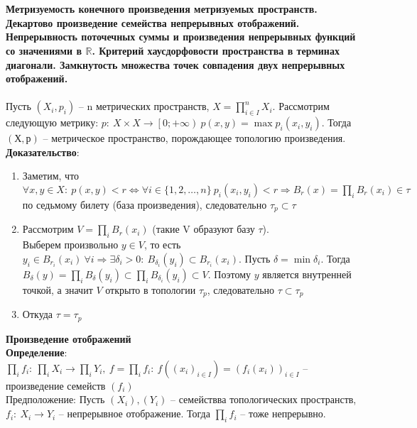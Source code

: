 \newpage
\section{}
	\textbf{Метризуемость конечного произведения метризуемых пространств. Декартово произведение семейства непрерывных отображений. Непрерывность поточечных суммы и произведения непрерывных функций со значениями в $\mathbb{R}$. Критерий хаусдорфовости пространства в терминах диагонали. Замкнутость множества точек совпадения двух непрерывных отображений.}\\
	\\
	Пусть $(X_i, p_i)$ -- n метрических пространств, $X = \prod_{i\in I}^n X_i$. Рассмотрим следующую метрику: $p:\ X\times X \rightarrow \left[0;+ \infty\right)\ p(x,y) = \max{p_i(x_i,y_i)}$. Тогда $(Х, р)$ -- метрическое пространство, порождающее топологию произведения.\\
	\textbf{Доказательство}:
	\begin{enumerate}
		\item 
		Заметим, что $\forall x, y \in X:\ p(x,y) < r \Leftrightarrow \forall i\in \{1, 2, \ldots ,n\}\ p_i(x_i,y_i) < r \Rightarrow B_r(x) = \prod_i B_r(x_i) \in \tau$ по седьмому билету (база произведения), следовательно $\tau_p \subset \tau$
		\item 
		Рассмотрим $V = \prod_i B_r(x_i)$ (такие V образуют базу $\tau$).\\
		Выберем произвольно $y\in V$, то есть $y_i\in B_{r_i}(x_i)\ \forall i \Rightarrow \exists \delta_i > 0:\ B_{\delta_i}(y_i) \subset B_{r_i}(x_i)$. Пусть $\delta = \min{\delta_i}$. Тогда $B_\delta (y) = \prod_i B_\delta(y_i) \subset \prod_i B_{\delta_i}(y_i) \subset V$. Поэтому $y$ является внутренней точкой, а значит $V$ открыто в топологии $\tau_p$, следовательно $\tau \subset \tau_p$
		\item
		Откуда $\tau = \tau_p$\\
	\end{enumerate}
	\textbf{Произведение отображений}\\
	\textbf{Определение}: $\prod_i f_i:\ \prod_i X_i \rightarrow \prod_i Y_i,\ f = \prod_i f_i:\ f((x_i)_{i\in I}) = (f_i(x_i))_{i\in I}$ -- произведение семейств $(f_i)$\\
	Предположение: Пусть $(X_i),(Y_i)$ -- семействва топологических пространств, $f_i:\ X_i \rightarrow Y_i$ -- непрерывное отображение. Тогда $\prod_i f_i$ -- тоже непрерывно.\\
